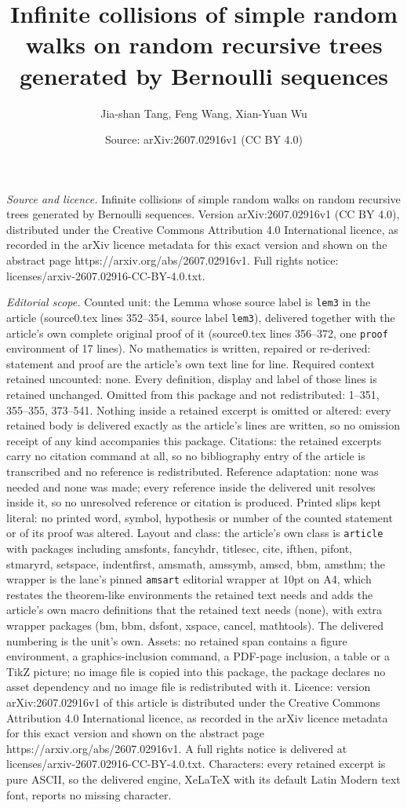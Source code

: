 \documentclass[10pt,a4paper]{amsart}
\title[Infinite collisions of simple random walks on random recursi]{Infinite collisions of simple random walks on random recursive trees generated by Bernoulli sequences}
\author{Jia-shan Tang, Feng Wang, Xian-Yuan Wu}
\date{Source: arXiv:2607.02916v1 (CC BY 4.0)}
\begin{document}
\maketitle

\noindent\emph{Source and licence.} Infinite collisions of simple random walks on random recursive trees generated by Bernoulli sequences. Version arXiv:2607.02916v1 (CC BY 4.0), distributed under the Creative Commons Attribution 4.0 International licence, as recorded in the arXiv licence metadata for this exact version and shown on the abstract page https://arxiv.org/abs/2607.02916v1. Full rights notice: licenses/arxiv-2607.02916-CC-BY-4.0.txt.\par\smallskip

\noindent\textit{Editorial scope.} Counted unit: the Lemma whose source label is \texttt{lem3} in the article (source0.tex lines 352--354, source label \texttt{lem3}), delivered together with the article's own complete original proof of it (source0.tex lines 356--372, one \texttt{proof} environment of 17 lines). No mathematics is written, repaired or re-derived: statement and proof are the article's own text line for line. Required context retained uncounted: none. Every definition, display and label of those lines is retained unchanged. Omitted from this package and not redistributed: 1--351, 355--355, 373--541. Nothing inside a retained excerpt is omitted or altered: every retained body is delivered exactly as the article's lines are written, so no omission receipt of any kind accompanies this package. Citations: the retained excerpts carry no citation command at all, so no bibliography entry of the article is transcribed and no reference is redistributed. Reference adaptation: none was needed and none was made; every reference inside the delivered unit resolves inside it, so no unresolved reference or citation is produced. Printed slips kept literal: no printed word, symbol, hypothesis or number of the counted statement or of its proof was altered. Layout and class: the article's own class is \texttt{article} with packages including amsfonts, fancyhdr, titlesec, cite, ifthen, pifont, stmaryrd, setspace, indentfirst, amsmath, amssymb, amscd, bbm, amsthm; the wrapper is the lane's pinned \texttt{amsart} editorial wrapper at 10pt on A4, which restates the theorem-like environments the retained text needs and adds the article's own macro definitions that the retained text needs (none), with extra wrapper packages (bm, bbm, dsfont, xspace, cancel, mathtools). The delivered numbering is the unit's own. Assets: no retained span contains a figure environment, a graphics-inclusion command, a PDF-page inclusion, a table or a TikZ picture; no image file is copied into this package, the package declares no asset dependency and no image file is redistributed with it. Licence: version arXiv:2607.02916v1 of this article is distributed under the Creative Commons Attribution 4.0 International licence, as recorded in the arXiv licence metadata for this exact version and shown on the abstract page https://arxiv.org/abs/2607.02916v1. A full rights notice is delivered at licenses/arxiv-2607.02916-CC-BY-4.0.txt. Characters: every retained excerpt is pure ASCII, so the delivered engine, XeLaTeX with its default Latin Modern text font, reports no missing character.
\end{document}
